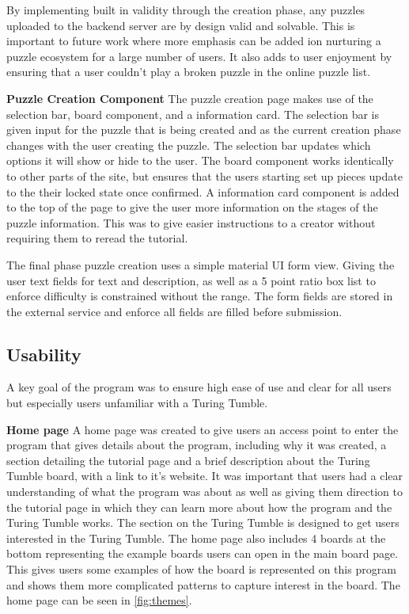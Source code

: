 \documentclass{l4proj}
\begin{document}
By implementing built in validity through the creation phase, any puzzles uploaded to the backend server are by design valid and solvable. This is important to future work where more emphasis can be added ion nurturing a puzzle ecosystem for a large number of users. It also adds to user enjoyment by ensuring that a user couldn't play a broken puzzle in the online puzzle list.

\textbf{Puzzle Creation Component}
The puzzle creation page makes use of the selection bar, board component, and a information card. The selection bar is given input for the puzzle that is being created and as the current creation phase changes with the user creating the puzzle. The selection bar updates which options it will show or hide to the user. The board component works identically to other parts of the site, but ensures that the users starting set up pieces update to the their locked state once confirmed. A information card component is added to the top of the page to give the user more information on the stages of the puzzle information. This was to give easier instructions to a creator without requiring them to reread the tutorial. 

The final phase puzzle creation uses a simple material UI form view. Giving the user text fields for text and description, as well as a 5 point ratio box list to enforce difficulty is constrained without the range. The form fields are stored in the external service and enforce all fields are filled before submission.

\subsection{Usability}
A key goal of the program was to ensure high ease of use and clear for all users but especially users unfamiliar with a Turing Tumble. 

\textbf{Home page}
A home page was created to give users an access point to enter the program that gives details about the program, including why it was created, a section detailing the tutorial page and a brief description about the Turing Tumble board, with a link to it's website. It was important that users had a clear understanding of what the program was about as well as giving them direction to the tutorial page in which they can learn more about how the program and the Turing Tumble works. The section on the Turing Tumble is designed to get users interested in the Turing Tumble. The home page also includes 4 boards at the bottom representing the example boards users can open in the main board page. This gives users some examples of how the board is represented on this program and shows them more complicated patterns to capture interest in the board. The home page can be seen in \ref{fig:themes}.
\end{document}
